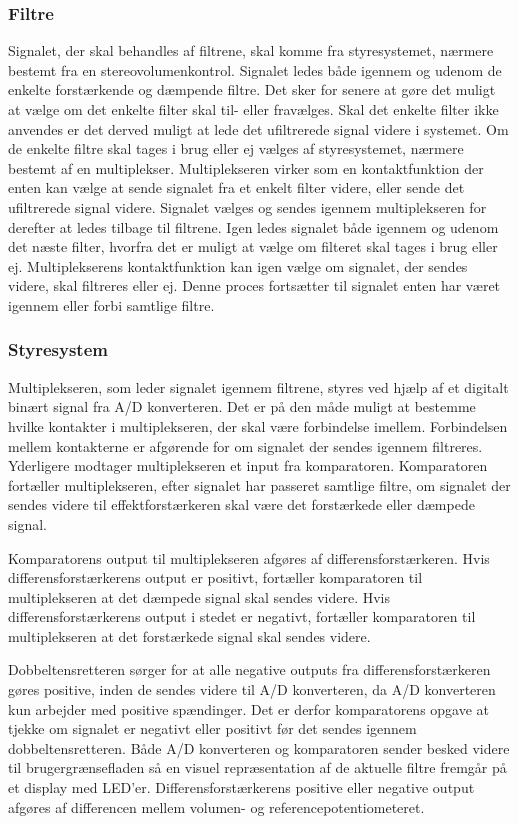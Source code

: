 \subsubsection{Filtre}
\label{SystemkravFiltre}
%
Signalet, der skal behandles af filtrene, skal komme fra styresystemet, nærmere bestemt fra en stereovolumenkontrol. Signalet ledes både igennem og udenom de enkelte forstærkende og dæmpende filtre. Det sker for senere at gøre det muligt at vælge om det enkelte filter skal til- eller fravælges. Skal det enkelte filter ikke anvendes er det derved muligt at lede det ufiltrerede signal videre i systemet. Om de enkelte filtre skal tages i brug eller ej vælges af styresystemet, nærmere bestemt af en multiplekser. Multiplekseren virker som en kontaktfunktion der enten kan vælge at sende signalet fra et enkelt filter videre, eller sende det ufiltrerede signal videre. Signalet vælges og sendes igennem multiplekseren for derefter at ledes tilbage til filtrene. Igen ledes signalet både igennem og udenom det næste filter, hvorfra det er muligt at vælge om filteret skal tages i brug eller ej. Multiplekserens kontaktfunktion kan igen vælge om signalet, der sendes videre, skal filtreres eller ej. Denne proces fortsætter til signalet enten har været igennem eller forbi samtlige filtre.             
%
\subsubsection{Styresystem}
\label{SystemkravStyresystem}
Multiplekseren, som leder signalet igennem filtrene, styres ved hjælp af et digitalt binært signal fra A/D konverteren. Det er på den måde muligt at bestemme hvilke kontakter i multiplekseren, der skal være forbindelse imellem. Forbindelsen mellem kontakterne er afgørende for om signalet der sendes igennem filtreres. Yderligere modtager multiplekseren et input fra komparatoren. Komparatoren fortæller multiplekseren, efter signalet har passeret samtlige filtre, om signalet der sendes videre til effektforstærkeren skal være det forstærkede eller dæmpede signal.\par
Komparatorens output til multiplekseren afgøres af differensforstærkeren. Hvis differensforstærkerens output er positivt, fortæller komparatoren til multiplekseren at det dæmpede signal skal sendes videre. Hvis differensforstærkerens output i stedet er negativt, fortæller komparatoren til multiplekseren at det forstærkede signal skal sendes videre.\par
Dobbeltensretteren sørger for at alle negative outputs fra differensforstærkeren gøres positive, inden de sendes videre til A/D konverteren, da A/D konverteren kun arbejder med positive spændinger. Det er derfor komparatorens opgave at tjekke om signalet er negativt eller positivt før det sendes igennem dobbeltensretteren. Både A/D konverteren og komparatoren sender besked videre til brugergrænsefladen så en visuel repræsentation af de aktuelle filtre fremgår på et display med LED'er. Differensforstærkerens positive eller negative output afgøres af differencen mellem  volumen- og referencepotentiometeret. 
%
